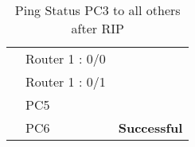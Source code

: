 \documentclass[a4paper,11pt]{article}
\begin{document}
\begin{enumerate}
\begin{table}[H]
\begin{tabular}{| m{10em}| m{10em}| m{10em} |}
                  {\cellcolor[rgb]{0.141,0.525,1}}                                & Router 1 : 0/0       & {\cellcolor[rgb]{0.42,0.988,0.827}}                                        \\
                  \hhline{|>{\arrayrulecolor[rgb]{0.141,0.525,1}}->{\arrayrulecolor{black}}->{\arrayrulecolor[rgb]{0.42,0.988,0.827}}->{\arrayrulecolor{black}}|}
                  {\cellcolor[rgb]{0.141,0.525,1}}                                & Router 1 : 0/1       & {\cellcolor[rgb]{0.42,0.988,0.827}}                                        \\
                  \hhline{|>{\arrayrulecolor[rgb]{0.141,0.525,1}}->{\arrayrulecolor{black}}->{\arrayrulecolor[rgb]{0.42,0.988,0.827}}->{\arrayrulecolor{black}}|}
                  {\cellcolor[rgb]{0.141,0.525,1}}                                & PC5                  & {\cellcolor[rgb]{0.42,0.988,0.827}}                                        \\
                  \hhline{|>{\arrayrulecolor[rgb]{0.141,0.525,1}}->{\arrayrulecolor{black}}->{\arrayrulecolor[rgb]{0.42,0.988,0.827}}->{\arrayrulecolor{black}}|}
                  \multirow{-10}{*}{{\cellcolor[rgb]{0.141,0.525,1}}\textbf{PC3}} & PC6                  & \multirow{-10}{*}{{\cellcolor[rgb]{0.42,0.988,0.827}} \textbf{Successful}} \\
                  \hline
              \end{tabular}
              \caption{ Ping Status PC3 to all others after RIP}
          \end{table}




          \begin{table}[H]
              \centering


\end{table}
\end{enumerate}
\end{document}
